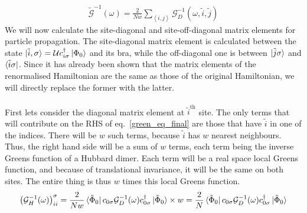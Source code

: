 \documentclass[12pt]{article}
\numberwithin{equation}{section}
\begin{document}
\begin{equation}\begin{aligned}
	\label{green_eq_final}
	\mathcal{\tilde G}^{-1}(\omega) = \frac{2}{Nw}\sum_{\left<i,j\right>}\mathcal{G}_D^{-1}\left(\omega, \tilde i, \tilde j\right)
\end{aligned}\end{equation}
We will now calculate the site-diagonal and site-off-diagonal matrix elements for particle propagation. The site-diagonal matrix element is calculated between the state $\ket{\tilde i, \sigma} = \mathcal{U}c^\dagger_{i\sigma}\ket{\Phi_0}$ and its bra, while the off-diagonal one is between $\ket{\tilde j\sigma}$ and $\bra{\tilde i\sigma}$. Since it has already been shown that the matrix elements of the renormalised Hamiltonian are the same as those of the original Hamiltonian, we will directly replace the former with the latter. \\\\
First lets consider the diagonal matrix element at $\tilde i^\text{th}$ site. The only terms that will contribute on the RHS of eq.~\ref{green_eq_final} are those that have $\tilde i$ in one of the indices. There will be $w$ such terms, because $\tilde i$ has $w$ nearest neighbours. Thus, the right hand side will be a sum of $w$ terms, each term being the inverse Greens function of a Hubbard dimer. Each term will be a real space local Greens function, and because of translational invariance, it will be the same on both sites. %
The entire thing is thus $w$ times this local Greens function.
\begin{gather}
	\label{local_gf}
	\left(\mathcal{G}_{H}^{-1}(\omega)\right)_{ii}^\sigma = \frac{2}{Nw}\bra{\tilde \Phi_0}c_{0\sigma}\mathcal{G}_{D}^{-1}(\omega)c^\dagger_{0\sigma}\ket{\tilde \Phi_0}\times w = \frac{2}{N}\bra{\tilde \Phi_0}c_{0\sigma}\mathcal{G}_{D}^{-1}(\omega)c^\dagger_{0\sigma}\ket{\tilde \Phi_0}
\end{gather}
\end{document}
